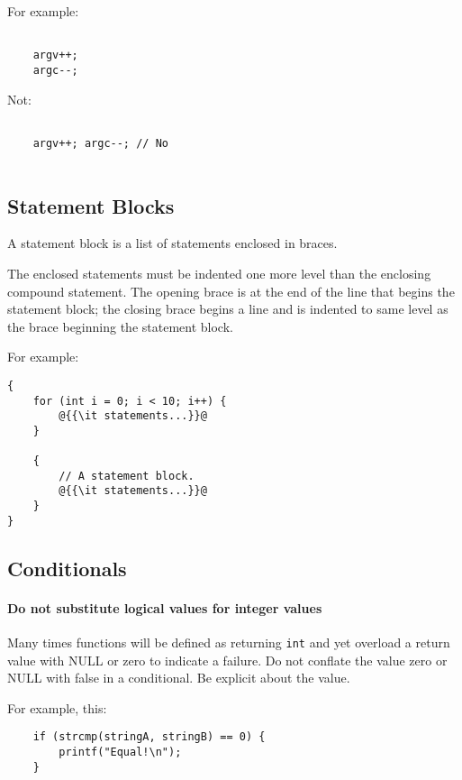 \documentclass[fleqn,12pt]{PARCOneColumn} %
\begin{document}
For example:

\begin{lstlisting}

    argv++;
    argc--; 

\end{lstlisting}

Not:

\begin{lstlisting}[backgroundcolor=\color{badCodeColor}]

    argv++; argc--; // No
    
\end{lstlisting}

\subsection{Statement Blocks}
A statement block is a list of statements enclosed in braces.

The enclosed statements must be indented one more level than the enclosing compound statement.
The opening brace is at the end of the line that begins the statement block;
the closing brace begins a line and is indented to same level as the brace beginning the statement block.

For example:

\begin{lstlisting}
{
    for (int i = 0; i < 10; i++) {
        @{{\it statements...}}@
    }

    {
        // A statement block.
        @{{\it statements...}}@
    }
}
\end{lstlisting}

\subsection{Conditionals}

\paragraph{Do not substitute logical values for integer values}

Many times functions will be defined as returning {\tt int} and yet overload a return value with NULL or zero to indicate a failure.  Do not conflate the value zero or NULL with false in a conditional.  Be explicit about the value.

For example, this:
\begin{lstlisting}
    if (strcmp(stringA, stringB) == 0) {
        printf("Equal!\n");
    }
    
\end{lstlisting}
\end{document}
